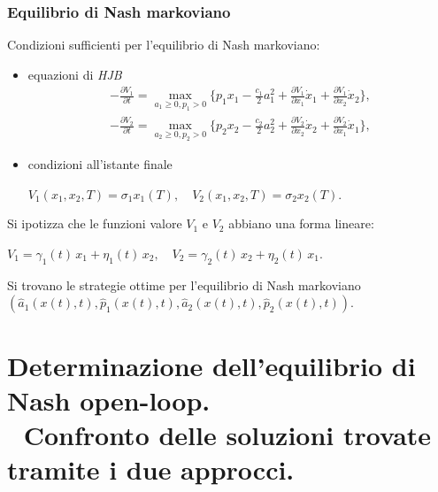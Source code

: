 \documentclass{beamer}
\theoremstyle{plain}
\theoremstyle{definition}
\begin{document}
\begin{frame}
\frametitle{Equilibrio di Nash markoviano}
Condizioni sufficienti per l'equilibrio di Nash markoviano:
\begin{itemize}
\item equazioni di \emph{HJB}
\begin{gather*}
- \frac{\partial V_1}{\partial t} = \max_{a_1 \geq 0, p_1 > 0} \Big\{ p_1 x_1 - \frac{c_1}{2} a_1^2 + \frac{\partial V_1}{\partial x_1} \dot{x}_1 + \frac{\partial V_1}{\partial x_2} \dot{x}_2 \Big\}, \\
- \frac{\partial V_2}{\partial t} = \max_{a_2 \geq 0, p_2 > 0} \Big\{ p_2 x_2 - \frac{c_2}{2} a_2^2 + \frac{\partial V_2}{\partial x_2} \dot{x}_2 + \frac{\partial V_2}{\partial x_1} \dot{x}_1 \Big\},
\end{gather*}
\item condizioni all'istante finale \\
\begin{center} $V_1(x_1, x_2, T) = \sigma_1 x_1(T), \quad 
    V_2(x_1, x_2, T) = \sigma_2 x_2(T)$. \end{center}

\end{itemize}
Si ipotizza che le funzioni valore $V_1$ e $V_2$ abbiano una forma lineare: 
\begin{center} 
$V_1 = \gamma_1(t)\, x_1 + \eta_1(t)\, x_2, \quad 
V_2 = \gamma_2(t)\, x_2 + \eta_2(t)\, x_1$. \\ \end{center}

Si trovano le strategie ottime per l'equilibrio di Nash markoviano $(\hat{a}_1(x(t),t),\hat{p}_1(x(t),t),\hat{a}_2(x(t),t),\hat{p}_2(x(t),t))$.

\end{frame}

\section{Determinazione dell'equilibrio di Nash open-loop. \\ 
\,\,\,\,Confronto delle soluzioni trovate tramite i due approcci. }
\end{document}
